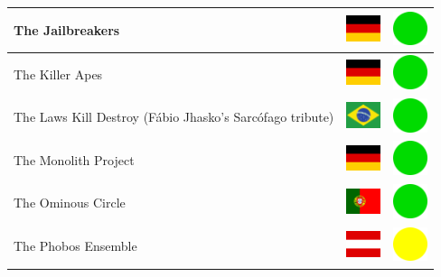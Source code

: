 \documentclass[12pt, a4paper, twoside]{report}
\begin{document}
\begin{center}
\begin{longtable}{|p{5cm}|p{2cm}|p{2cm}|}
 The Jailbreakers                                           & \includegraphics[width=1cm]{4x3/de} &   \includegraphics[width=1cm]{likes/y} \\ \hline
 The Killer Apes                                            & \includegraphics[width=1cm]{4x3/de} &   \includegraphics[width=1cm]{likes/y} \\ \hline
 The Laws Kill Destroy (Fábio Jhasko's Sarcófago tribute)   & \includegraphics[width=1cm]{4x3/br} &   \includegraphics[width=1cm]{likes/y} \\ \hline
 The Monolith Project                                       & \includegraphics[width=1cm]{4x3/de} &   \includegraphics[width=1cm]{likes/y} \\ \hline
 The Ominous Circle                                         & \includegraphics[width=1cm]{4x3/pt} &   \includegraphics[width=1cm]{likes/y} \\ \hline
 The Phobos Ensemble                                        & \includegraphics[width=1cm]{4x3/at} &   \includegraphics[width=1cm]{likes/m} \\ \hline

\end{longtable}
\end{center}
\end{document}
